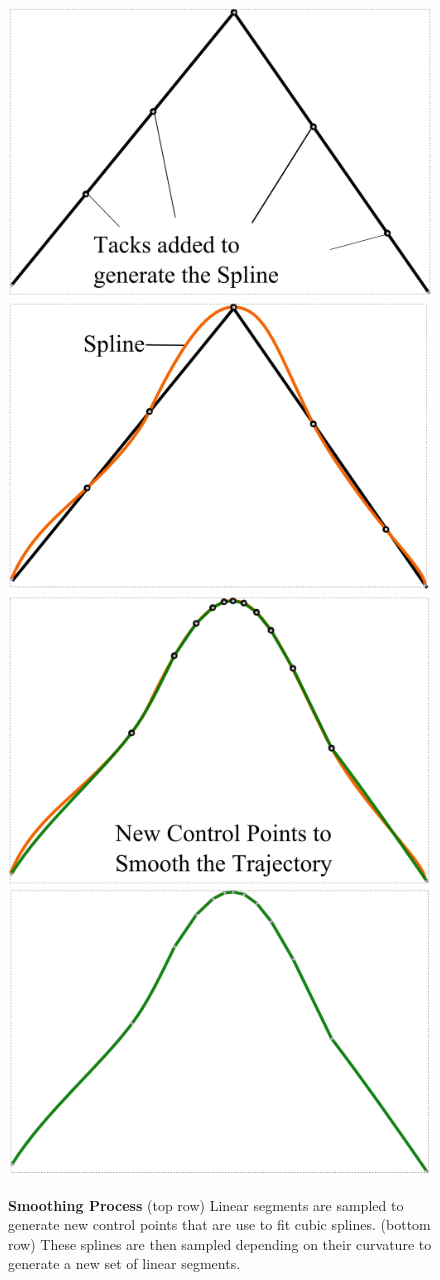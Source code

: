 \begin{figure}[t]
	\begin{center}
	\includegraphics[width=0.48\linewidth]{./images/Smooth1.png}
	\includegraphics[width=0.48\linewidth]{./images/Smooth2.png}\\
	\includegraphics[width=0.48\linewidth]{./images/Smooth3.png}
	\includegraphics[width=0.48\linewidth]{./images/Smooth4.png}
	\caption{
		\textbf{Smoothing Process}
		(top row) Linear segments are sampled to generate new control points that are use to fit cubic splines.
		(bottom row) These splines are then sampled depending on their curvature to generate a new set of linear segments.
	}
	\label{fig:smoothing}
	\end{center}
\end{figure}

